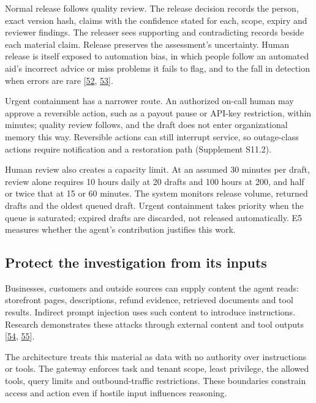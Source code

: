 \documentclass[acmlarge,review,anonymous,nonacm]{acmart}
\begin{document}
Normal release follows quality review. The release decision records the
person, exact version hash, claims with the confidence stated for each,
scope, expiry and reviewer findings. The releaser sees supporting and
contradicting records beside each material claim. Release preserves the
assessment's uncertainty. Human release is itself exposed to automation
bias, in which people follow an automated aid's incorrect advice or miss
problems it fails to flag, and to the fall in detection when errors are
rare {[}\protect\hyperlink{ref-ParasuramanManzey2010}{52},
\protect\hyperlink{ref-Wolfe2005Rare}{53}{]}.

Urgent containment has a narrower route. An authorized on-call human may
approve a reversible action, such as a payout pause or API-key
restriction, within minutes; quality review follows, and the draft does
not enter organizational memory this way. Reversible actions can still
interrupt service, so outage-class actions require notification and a
restoration path (Supplement S11.2).

Human review also creates a capacity limit. At an assumed 30 minutes per
draft, review alone requires 10 hours daily at 20 drafts and 100 hours
at 200, and half or twice that at 15 or 60 minutes. The system monitors
release volume, returned drafts and the oldest queued draft. Urgent
containment takes priority when the queue is saturated; expired drafts
are discarded, not released automatically. E5 measures whether the
agent's contribution justifies this work.

\hypertarget{protect-the-investigation-from-its-inputs}{%
\subsection{Protect the investigation from its
inputs}\label{protect-the-investigation-from-its-inputs}}

Businesses, customers and outside sources can supply content the agent
reads: storefront pages, descriptions, refund evidence, retrieved
documents and tool results. Indirect prompt injection uses such content
to introduce instructions. Research demonstrates these attacks through
external content and tool outputs
{[}\protect\hyperlink{ref-Greshake2023}{54},
\protect\hyperlink{ref-Debenedetti2024}{55}{]}.

The architecture treats this material as data with no authority over
instructions or tools. The gateway enforces task and tenant scope, least
privilege, the allowed tools, query limits and outbound-traffic
restrictions. These boundaries constrain access and action even if
hostile input influences reasoning.
\end{document}
